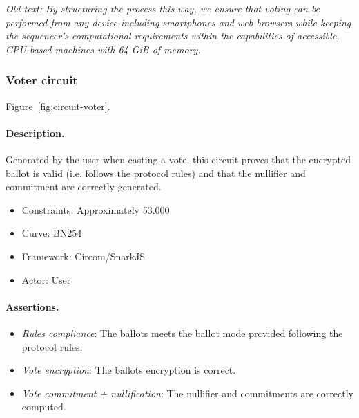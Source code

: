 \textit{Old text: By structuring the process this way, we ensure that voting can be performed from any device-including smartphones and web browsers-while keeping the sequencer's computational requirements within the capabilities of accessible, CPU-based machines with 64 GiB of memory.}





\subsubsection{Voter circuit}

Figure~\ref{fig:circuit-voter}.


\paragraph{Description.} Generated by the user when casting a vote, this circuit proves that the encrypted ballot is valid (i.e. follows the protocol rules) and that the nullifier and commitment are correctly generated.

\begin{itemize}
	\item Constraints: Approximately 53.000
	\item Curve: BN254
	\item Framework: Circom/SnarkJS
	\item Actor: User
\end{itemize}

\paragraph{Assertions.}

\begin{itemize}
	\item \emph{Rules compliance}: The ballots meets the ballot mode provided following the protocol rules.
	\item \emph{Vote encryption}: The ballots encryption is correct.
	\item \emph{Vote commitment + nullification}: The nullifier and commitments are correctly computed.
\end{itemize}

